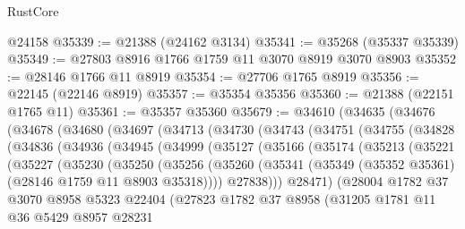 \begin{lexlean}{RustCore}
\begin{coremodule}
    @24158
@35339 := @21388 (@24162 @3134)
@35341 := @35268 (@35337 @35339)
@35349 := @27803 @8916 @1766 @1759 @11 @3070 @8919 @3070 @8903
@35352 := @28146 @1766 @11 @8919
@35354 := @27706 @1765 @8919
@35356 := @22145 (@22146 @8919)
@35357 := @35354 @35356
@35360 := @21388 (@22151 @1765 @11)
@35361 := @35357 @35360
@35679 := @34610
    (@34635
      (@34676
        (@34678
          (@34680
            (@34697
              (@34713
                (@34730
                  (@34743
                    (@34751
                      (@34755
                        (@34828
                          (@34836
                            (@34936
                              (@34945
                                (@34999
                                  (@35127
                                    (@35166
                                      (@35174
                                        (@35213
                                          (@35221
                                            (@35227
                                              (@35230
                                                (@35250
                                                  (@35256
                                                    (@35260
                                                      (@35341
                                                        (@35349
                                                          (@35352 @35361)
                                                          (@28146 @1759 @11 @8903 @35318))))
                                                    @27838)))
                                              @28471)
                                            (@28004
                                              @1782
                                              @37
                                              @3070
                                              @8958
                                              @5323
                                              @22404
                                              (@27823
                                                @1782
                                                @37
                                                @8958
                                                (@31205
                                                  @1781
                                                  @11
                                                  @36
                                                  @5429
                                                  @8957
                                                  @28231

\end{coremodule}
\end{lexlean}
